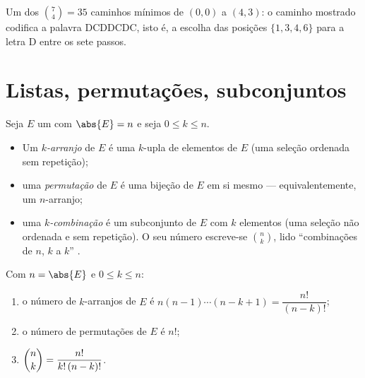 \begin{omfigure}

{\small Um dos $\binom74 = 35$ caminhos mínimos de $(0,0)$ a
$(4,3)$: o caminho mostrado codifica a palavra DCDDCDC, isto é, a escolha
das posições $\{1,3,4,6\}$ para a letra D entre os sete
passos.}
\end{omfigure}

\section{Listas, permutações, subconjuntos}

\begin{definition}\label{def:b1:counting:objects}
Seja $E$ um  com $\abs{E} = n$ e seja $0 \leq k \leq n$.
\begin{itemize}
  \item Um \emph{$k$-arranjo} de $E$ é uma $k$-upla  de
        elementos de $E$ (uma seleção ordenada sem repetição);
  \item uma \emph{permutação} de $E$ é uma bijeção
        de $E$ em si mesmo --- equivalentemente, um $n$-arranjo;
  \item uma \emph{$k$-combinação} é um subconjunto de $E$ com $k$
        elementos (uma seleção não ordenada e sem repetição). O seu
        número escreve-se $\binom{n}{k}$, lido ``combinações de $n$, $k$ a $k$''
        .
\end{itemize}
\end{definition}

\begin{theorem}\label{thm:b1:counting:counts}
Com $n = \abs{E}$ e $0 \leq k \leq n$:
\begin{enumerate}
  \item o número de $k$-arranjos de $E$ é $n (n-1) \cdots
        (n-k+1) = \dfrac{n!}{(n-k)!}$;
  \item o número de permutações de $E$ é $n!$;
  \item $\dbinom{n}{k} = \dfrac{n!}{k!\,(n-k)!}$.
\end{enumerate}
\end{theorem}

